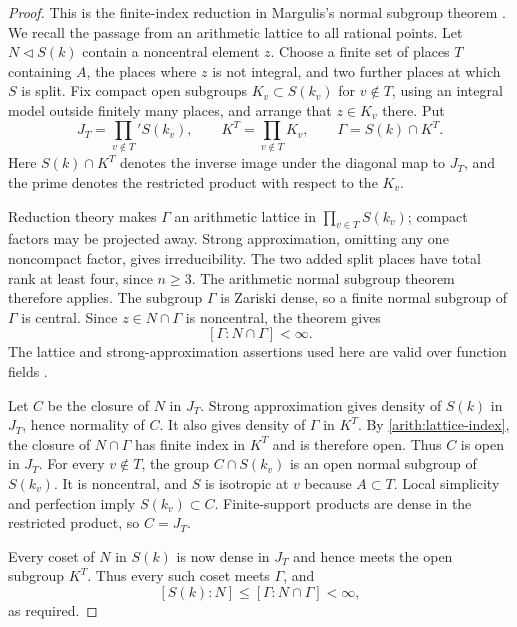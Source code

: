 \begin{proof}
This is the finite-index reduction in Margulis's normal subgroup theorem
\cite[Theorem~2.4.6 and Corollary~2.4.9]{Margulis1979}\cite{Margulis}.
We recall the passage from an arithmetic lattice to all rational points.
Let $N\triangleleft S(k)$ contain a noncentral element $z$.  Choose a
finite set of places $T$ containing $A$, the places where $z$ is not
integral, and two further places at which $S$ is split.  Fix compact open
subgroups $K_v\subset S(k_v)$ for $v\notin T$, using an integral model
outside finitely many places, and arrange that $z\in K_v$ there.  Put
\[
 J_T=\prod_{v\notin T}'S(k_v),\qquad
 K^T=\prod_{v\notin T}K_v,\qquad
 \Gamma=S(k)\cap K^T.
\]
Here $S(k)\cap K^T$ denotes the inverse image under the diagonal map to
$J_T$, and the prime denotes the restricted product with respect to the
$K_v$.

Reduction theory makes $\Gamma$ an arithmetic lattice in
$\prod_{v\in T}S(k_v)$; compact factors may be projected away.  Strong
approximation, omitting any one noncompact factor, gives irreducibility.
The two added split places have total rank at least four, since
$n\geq3$.  The arithmetic normal subgroup theorem therefore applies.
The subgroup $\Gamma$ is Zariski dense, so a finite normal subgroup of
$\Gamma$ is central.  Since $z\in N\cap\Gamma$ is noncentral, the theorem
gives
\begin{equation}\label{arith:lattice-index}
 [\Gamma:N\cap\Gamma]<\infty.
\end{equation}
The lattice and strong-approximation assertions used here are valid over
function fields \cite{HarderReduction,PrasadSA,Margulis}.

Let $C$ be the closure of $N$ in $J_T$.  Strong approximation gives density
of $S(k)$ in $J_T$, hence normality of $C$.  It also gives density of
$\Gamma$ in $K^T$.  By \eqref{arith:lattice-index}, the closure of
$N\cap\Gamma$ has finite index in $K^T$ and is therefore open.  Thus $C$
is open in $J_T$.  For every $v\notin T$, the group
$C\cap S(k_v)$ is an open normal subgroup of $S(k_v)$.  It is noncentral,
and $S$ is isotropic at $v$ because $A\subset T$.  Local simplicity and
perfection imply $S(k_v)\subset C$.  Finite-support products are dense
in the restricted product, so $C=J_T$.

Every coset of $N$ in $S(k)$ is now dense in $J_T$ and hence meets the
open subgroup $K^T$.  Thus every such coset meets $\Gamma$, and
\[
 [S(k):N]\leq[\Gamma:N\cap\Gamma]<\infty,
\]
as required.
\end{proof}

